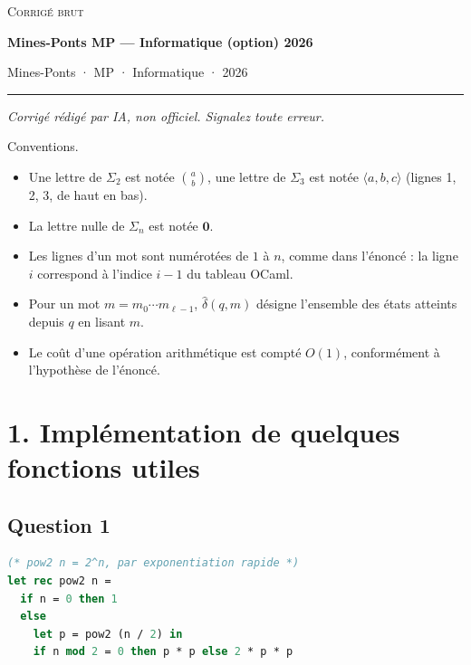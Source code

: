 \documentclass[11pt,a4paper]{article}
\providecommand{\tightlist}{\setlength{\itemsep}{0pt}\setlength{\parskip}{0pt}}
\begin{document}
\thispagestyle{plain}
\begin{center}
  {\small\scshape Corrigé brut}\par\smallskip
  {\LARGE\bfseries Mines-Ponts MP — Informatique (option) 2026\par}\medskip
  {\large Mines-Ponts · MP · Informatique · 2026\par}
\end{center}
\vspace{2pt}\hrule\vspace{8pt}

\emph{Corrigé rédigé par IA, non officiel. Signalez toute erreur.}

Conventions.

\begin{itemize}
\tightlist
\item
  Une lettre de \(\Sigma_2\) est notée \(\binom{a}{b}\), une lettre de \(\Sigma_3\) est notée \(\langle a,b,c\rangle\) (lignes 1, 2, 3, de haut en bas).
\item
  La lettre nulle de \(\Sigma_n\) est notée \(\mathbf{0}\).
\item
  Les lignes d'un mot sont numérotées de \(1\) à \(n\), comme dans l'énoncé : la ligne \(i\) correspond à l'indice \(i-1\) du tableau OCaml.
\item
  Pour un mot \(m=m_0\cdots m_{\ell-1}\), \(\widehat{\delta}(q,m)\) désigne l'ensemble des états atteints depuis \(q\) en lisant \(m\).
\item
  Le coût d'une opération arithmétique est compté \(O(1)\), conformément à l'hypothèse de l'énoncé.
\end{itemize}

\hypertarget{impluxe9mentation-de-quelques-fonctions-utiles}{%
\section{1. Implémentation de quelques fonctions utiles}\label{impluxe9mentation-de-quelques-fonctions-utiles}}

\hypertarget{question-1}{%
\subsection{Question 1}\label{question-1}}

\begin{lstlisting}[language=Caml]
(* pow2 n = 2^n, par exponentiation rapide *)
let rec pow2 n =
  if n = 0 then 1
  else
    let p = pow2 (n / 2) in
    if n mod 2 = 0 then p * p else 2 * p * p
\end{lstlisting}
\end{document}
